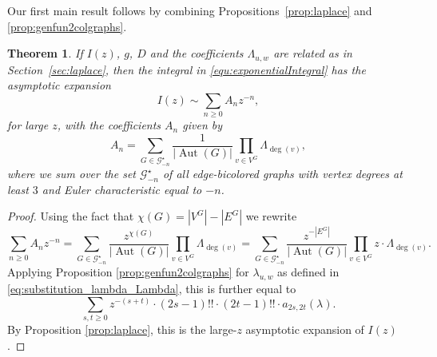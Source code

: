 \documentclass[english]{ourlematemasingle}
\newtheorem{theorem}{Theorem}
\numberwithin{theorem}{section}
\theoremstyle{remark}
\newcommand{\GGA}{\mathcal{G}^\star}
\DeclareMathOperator{\Aut}{Aut}
\newcommand{\ol}{\Lambda}
\begin{document}
Our first main result follows by combining Propositions~\ref{prop:laplace} and \ref{prop:genfun2colgraphs}.

\begin{theorem} 
\label{thm:laplace-graphs}
If $I(z)$, $g$, $D$ and the coefficients $\ol_{u,w}$ are related as in Section~\ref{sec:laplace}, then the 
integral in \eqref{equ:exponentialIntegral} has the asymptotic expansion
\[
I(z) \sim \sum_{n\geq 0} A_n z^{-n},
\]
for large $z$, with the coefficients $A_n$ given by
\[
A_n = \sum_{G \in \GGA_{-n}} 
        \frac{1 }{
\left\lvert \Aut(G) \right\rvert} 
\prod \limits _{v\in V^G}
\ol_{\deg(v)},
\]
where we sum over the set $\GGA_{-n}$ of all edge-bicolored graphs with vertex degrees at least $3$ and Euler characteristic equal to $-n$.
\end{theorem}
\begin{proof}
Using the fact that $\chi(G)=|V^G| - |E^G|$ we rewrite
\begin{equation*}
    \sum_{n\geq 0}A_nz^{-n} = \sum_{G\in \GGA_{-n}} \frac{z^{\chi(G)}}{|\Aut(G)|} \prod_{v\in V^G} \Lambda_{\deg(v)} = \sum_{G \in \GGA_{-n}} \frac{z^{-|E^G|}}{|\Aut(G)|} \prod_{v\in V^G} z\cdot \Lambda_{\deg(v)}.
\end{equation*}
Applying Proposition \ref{prop:genfun2colgraphs} for $\lambda_{u,w}$ as defined in \eqref{eq:substitution_lambda_Lambda}, this is further equal to
\[
    \sum_{s,t\geq 0} z^{-(s+t)}\cdot (2s-1)!!\cdot (2t-1)!!\cdot a_{2s,2t}(\lambda).
\]
By Proposition \ref{prop:laplace}, this is the large-$z$ asymptotic expansion of $I(z)$.
\end{proof}
\end{document}
